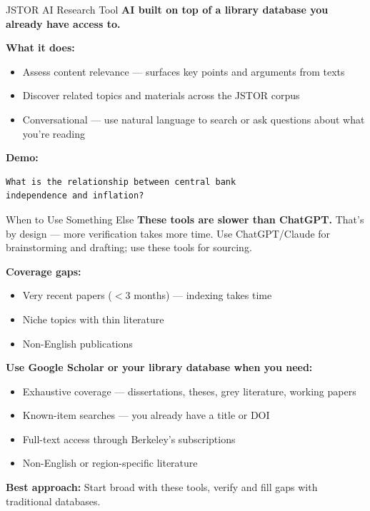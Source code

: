 \documentclass[aspectratio=169]{beamer}
\begin{document}
\begin{frame}[fragile]{JSTOR AI Research Tool}
    \textbf{AI built on top of a library database you already have access to.}

    \vspace{1em}
    \textbf{What it does:}
    \begin{itemize}
        \item Assess content relevance --- surfaces key points and arguments from texts
        \item Discover related topics and materials across the JSTOR corpus
        \item Conversational --- use natural language to search or ask questions about what you're reading
    \end{itemize}

    \vspace{1em}
    \textbf{Demo:}
    \begin{lstlisting}[basicstyle=\ttfamily\small]
What is the relationship between central bank
independence and inflation?
    \end{lstlisting}
\end{frame}

\begin{frame}{When to Use Something Else}
    \textbf{These tools are slower than ChatGPT.} That's by design --- more verification takes more time. Use ChatGPT/Claude for brainstorming and drafting; use these tools for sourcing.

    \vspace{0.5em}
    \textbf{Coverage gaps:}
    \begin{itemize}
        \item Very recent papers ($<$3 months) --- indexing takes time
        \item Niche topics with thin literature
        \item Non-English publications
    \end{itemize}

    \vspace{0.5em}
    \textbf{Use Google Scholar or your library database when you need:}
    \begin{itemize}
        \item Exhaustive coverage --- dissertations, theses, grey literature, working papers
        \item Known-item searches --- you already have a title or DOI
        \item Full-text access through Berkeley's subscriptions
        \item Non-English or region-specific literature
    \end{itemize}

    \vspace{0.5em}
    \textbf{Best approach:} Start broad with these tools, verify and fill gaps with traditional databases.
\end{frame}
\end{document}
